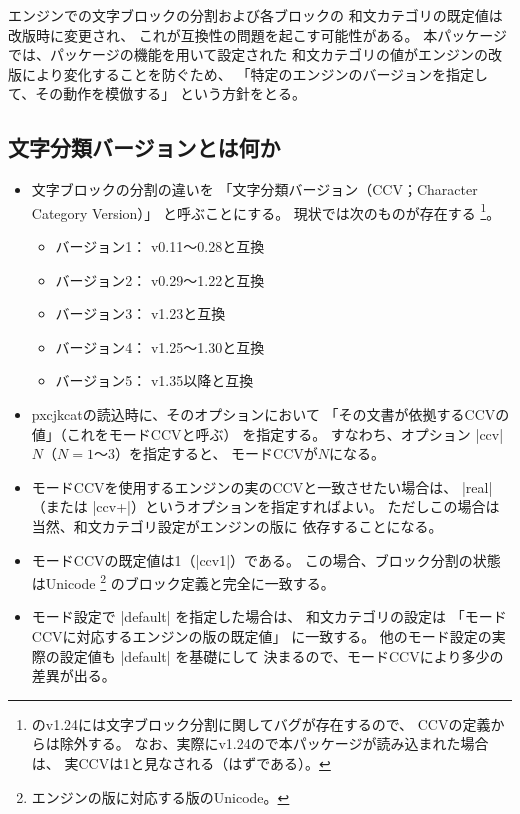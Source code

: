 \documentclass[uplatex,dvipdfmx,a4paper]{jsarticle}
\newcommand{\Pkg}[1]{\textsf{#1}}
\newcommand{\strong}{\textsf}
\begin{document}
\bigskip

{\upTeX}エンジンでの文字ブロックの分割および各ブロックの
和文カテゴリの既定値は改版時に変更され、
これが互換性の問題を起こす可能性がある。
本パッケージでは、パッケージの機能を用いて設定された
和文カテゴリの値がエンジンの改版により変化することを防ぐため、
「特定のエンジンのバージョンを指定して、その動作を模倣する」
という方針をとる。

\subsection{文字分類バージョンとは何か}

\begin{itemize}
\item 文字ブロックの分割の違いを
  「\strong{文字分類バージョン}（CCV；Character Category Version）」
  と呼ぶことにする。
  現状では次のものが存在する
  \footnote{{\upTeX}のv1.24には文字ブロック分割に関してバグが存在するので、
    CCVの定義からは除外する。
    なお、実際にv1.24の{\upTeX}で本パッケージが読み込まれた場合は、
    実CCVは1と見なされる（はずである）。}。
  \begin{itemize}
  \item バージョン1： {\upTeX} v0.11～0.28と互換
  \item バージョン2： {\upTeX} v0.29～1.22と互換
  \item バージョン3： {\upTeX} v1.23と互換
  \item バージョン4： {\upTeX} v1.25～1.30と互換
  \item バージョン5： {\upTeX} v1.35以降と互換
  \end{itemize}

\item \Pkg{pxcjkcat}の読込時に、そのオプションにおいて
  「その文書が依拠するCCVの値」（これを\strong{モードCCV}と呼ぶ）
  を指定する。
  すなわち、オプション |ccv|$N$（$N=\mbox{1～3}$）を指定すると、
  モードCCVが$N$になる。

\item モードCCVを使用するエンジンの実のCCVと一致させたい場合は、
  |real|（または |ccv+|）というオプションを指定すればよい。
  ただしこの場合は当然、和文カテゴリ設定がエンジンの版に
  依存することになる。

\item モードCCVの既定値は1（|ccv1|）である。
  この場合、ブロック分割の状態はUnicode%
  \footnote{エンジンの版に対応する版のUnicode。}%
  のブロック定義と完全に一致する。

\item モード設定で |default| を指定した場合は、
  和文カテゴリの設定は
  「モードCCVに対応するエンジンの版の既定値」
  に一致する。
  他のモード設定の実際の設定値も |default| を基礎にして
  決まるので、モードCCVにより多少の差異が出る。

\end{itemize}
\end{document}
